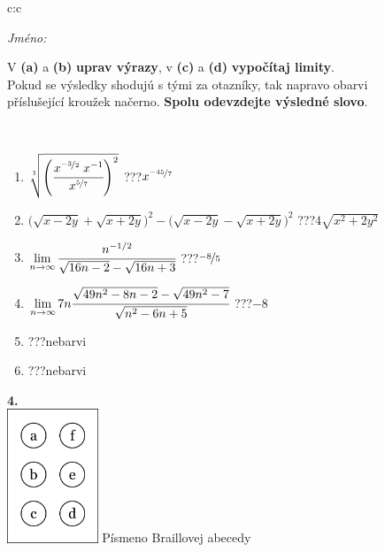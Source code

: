 \documentclass[10pt]{report}
\begin{document}
\begin{tabular}{c:c}
\begin{minipage}[c][104.5mm][t]{0.5\linewidth}
\begin{center}
\textit{Jméno:}\phantom{xxxxxxxxxxxxxxxxxxxxxxxxxxxxxxxxxxxxxxxxxxxxxxxxxxxxxxxxxxxxxxxxx}\\[5mm]
\begin{minipage}{0.95\linewidth}
\begin{center}
V \textbf{(a)} a \textbf{(b)} \textbf{uprav výrazy}, v \textbf{(c)} a \textbf{(d)} \textbf{vypočítaj limity}.\\Pokud se výsledky shodujú s tými za otazníky, tak napravo obarvi\\příslušející kroužek načerno. \textbf{Spolu odevzdejte výsledné slovo}.
\end{center}
\end{minipage}
\\[1mm]
\begin{minipage}{0.79\linewidth}
\begin{center}
\begin{varwidth}{\linewidth}
\begin{enumerate}
\small
\item $\sqrt[1]{\left(\cfrac{x^{\nicefrac{-3}{2}}\;x^{-1}}{x^{\nicefrac{5}{7}}}\right)^{2}}$\quad \dotfill\; ???\;\dotfill \quad $x^{\nicefrac{-45}{7}}$
\item {\footnotesize{\scriptsize$\big(\sqrt{x-2y}+\sqrt{x+2y}\big)^2-\big(\sqrt{x-2y}-\sqrt{x+2y}\big)^2$}\quad \dotfill\; ???\;\dotfill \quad $4\sqrt{x^2+2y^2}$}
\item $\lim\limits_{n\to\infty}\cfrac{n^{-1/2}}{\sqrt{16n-2}-\sqrt{16n+3}}$\quad \dotfill\; ???\;\dotfill \quad $\nicefrac{-8}{5}$
\item $\lim\limits_{n\to\infty}7n\cfrac{\sqrt{49n^2-8n-2}-\sqrt{49n^2-7}}{\sqrt{n^2-6n+5}}$\quad \dotfill\; ???\;\dotfill \quad $-8$
\item \quad \dotfill\; ???\;\dotfill \quad nebarvi
\item \quad \dotfill\; ???\;\dotfill \quad nebarvi
\end{enumerate}
\end{varwidth}
\end{center}
\end{minipage}
\begin{minipage}{0.20\linewidth}
\begin{center}
{\Huge\bfseries 4.} \\[2mm]
\includegraphics[height=40mm]{../images/braille.png}
{\small Písmeno Braillovej abecedy}
\end{center}
\end{minipage}
\end{center}
\end{minipage}
%
\end{tabular}
\end{document}
